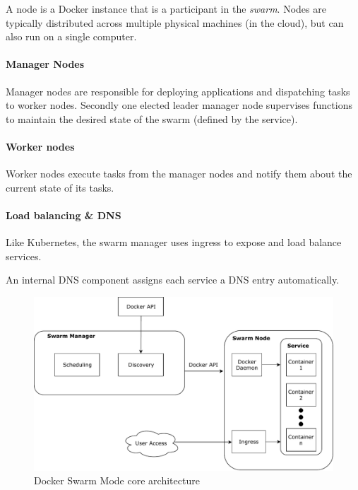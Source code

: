 A node is a Docker instance that is a participant in the \emph{swarm}.
Nodes are typically distributed across multiple physical machines (in
the cloud), but can also run on a single computer. \cite{dock-swarm}

\paragraph{Manager Nodes}\label{manager-nodes}

Manager nodes are responsible for deploying applications and dispatching
tasks to worker nodes. Secondly one elected leader manager node
supervises functions to maintain the desired state of the swarm (defined
by the service). \cite{dock-swarm}

\paragraph{Worker nodes}\label{worker-nodes}

Worker nodes execute tasks from the manager nodes and notify them about
the current state of its tasks.\cite{dock-swarm}

\paragraph{Load balancing \& DNS}\label{load-balancing-dns}

Like Kubernetes, the swarm manager uses ingress to expose and load
balance services.

An internal DNS component assigns each service a DNS entry
automatically. \cite{dock-swarm}

\begin{figure}
\centering
\includegraphics[width=15.00000cm]{images/swarm_core_architecture}
\caption{Docker Swarm Mode core
architecture\label{swarm_core_architecture} \cite{dock-swarm}}
\end{figure}

